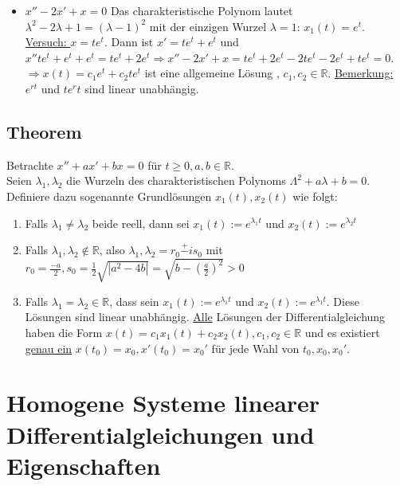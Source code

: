 \documentclass[12pt,a4paper]{article}
\newcommand{\DGL}{Differentialgleichung }
\newcommand{\DGLs}{Differentialgleichungen }
\newcommand{\Lsg}{Lösung }
\newcommand{\LSG}{Lösungen }
\begin{document}
\begin{itemize}
$\lambda_{1,2} = 1 \overset{+}{-} \sqrt{1-2} = 1 \overset{+}{-} i$. Komplexwertige \Lsg sind $e^{(1+i)t}$ und $e^{(1-i)t}$ bzw. $e^t(cos(t) + i \cdot sin(t))$ und $e^t(cos(t) - i \cdot sin(t))$. \LSG sind $x_1(t) = e^t cos(t), x_2(t) = e^t sin(t)$ (Prüfe nochmal durch einsetzen). Allgemeine \LSG sind dann $x(t) = c_1e^tcos(t) + c_2e^tsin(t)$ für $c_1, c_2 \in \mathbb{R}$.
\item $x''-2x'+x=0$ Das charakteristische Polynom lautet $\lambda^2-2\lambda+1 = (\lambda-1)^2$ mit der einzigen Wurzel $\lambda=1$: $x_1(t) = e^t$. \\
\underline{Versuch: } $x=te^t$. Dann ist $x'=te^t+e^t$ und $x''te^t+e^t+e^t = te^t + 2e^t \Rightarrow x''-2x'+x = te^t+2e^t-2te^t-2e^t+te^t=0$. \\
$\Rightarrow x(t) = c_1e^t+c_2te^t$ ist eine allgemeine \Lsg, $c_1, c_2 \in \mathbb{R}$.
\underline{Bemerkung:} $e^{rt}$ und $te^rt$ sind linear unabhängig.
\end{itemize}
\subsection{Theorem}
Betrachte $x''+ax'+bx=0$ für $t \geq 0, a,b \in \mathbb{R}$. \\
Seien $\lambda_1, \lambda_2$ die Wurzeln des charakteristischen Polynoms $\Lambda^2+a\lambda+b=0$. Definiere dazu sogenannte Grundlösungen $x_1(t), x_2(t)$ wie folgt: \\
\begin{enumerate}
\item Falls $\lambda_1 \neq \lambda_2$ beide reell, dann sei $x_1(t) := e^{\lambda_1t}$ und $x_2(t) := e^{\lambda_2t}$
\item Falls $\lambda_1, \lambda_2 \notin \mathbb{R}$, also $\lambda_1, \lambda_2 = r_0 \overset{+}{-} i s_0$ mit $r_0 = \frac{-a}{2}, s_0 = \frac{1}{2} \sqrt{|a^2-4b|} = \sqrt{b-(\frac{a}{2})^2}>0$
\item Falls $\lambda_1=\lambda_2 \in \mathbb{R}$, dass sein $x_1(t) := e^{\lambda_1t}$ und $x_2(t) := e^{\lambda_1t}$. Diese \LSG sind linear unabhängig. \underline{Alle} \LSG der \DGL haben die Form $x(t) = c_1x_1(t) + c_2x_2(t), c_1, c_2 \in \mathbb{R}$ und es existiert \underline{genau ein} $x(t_0) = x_0, x'(t_0) = x_0'$ für jede Wahl von $t_0, x_0, x_0'$.
\end{enumerate}

\section{Homogene Systeme linearer \DGLs und Eigenschaften}
\end{document}

